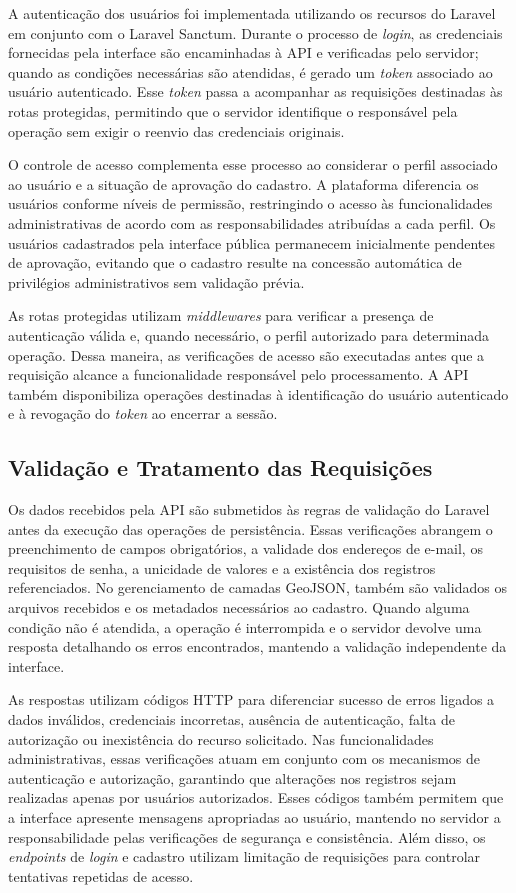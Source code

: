 A autenticação dos usuários foi implementada utilizando os recursos do Laravel em conjunto com o Laravel Sanctum. Durante o processo de \textit{login}, as credenciais fornecidas pela interface são encaminhadas à API e verificadas pelo servidor; quando as condições necessárias são atendidas, é gerado um \textit{token} associado ao usuário autenticado. Esse \textit{token} passa a acompanhar as requisições destinadas às rotas protegidas, permitindo que o servidor identifique o responsável pela operação sem exigir o reenvio das credenciais originais.

O controle de acesso complementa esse processo ao considerar o perfil associado ao usuário e a situação de aprovação do cadastro. A plataforma diferencia os usuários conforme níveis de permissão, restringindo o acesso às funcionalidades administrativas de acordo com as responsabilidades atribuídas a cada perfil. Os usuários cadastrados pela interface pública permanecem inicialmente pendentes de aprovação, evitando que o cadastro resulte na concessão automática de privilégios administrativos sem validação prévia.

As rotas protegidas utilizam \textit{middlewares} para verificar a presença de autenticação válida e, quando necessário, o perfil autorizado para determinada operação. Dessa maneira, as verificações de acesso são executadas antes que a requisição alcance a funcionalidade responsável pelo processamento. A API também disponibiliza operações destinadas à identificação do usuário autenticado e à revogação do \textit{token} ao encerrar a sessão.

\subsection{Validação e Tratamento das Requisições}
\label{sec:validacao-requisicoes}

Os dados recebidos pela API são submetidos às regras de validação do Laravel antes da execução das operações de persistência. Essas verificações abrangem o preenchimento de campos obrigatórios, a validade dos endereços de e-mail, os requisitos de senha, a unicidade de valores e a existência dos registros referenciados. No gerenciamento de camadas GeoJSON, também são validados os arquivos recebidos e os metadados necessários ao cadastro. Quando alguma condição não é atendida, a operação é interrompida e o servidor devolve uma resposta detalhando os erros encontrados, mantendo a validação independente da interface.

As respostas utilizam códigos HTTP para diferenciar sucesso de erros ligados a dados inválidos, credenciais incorretas, ausência de autenticação, falta de autorização ou inexistência do recurso solicitado. Nas funcionalidades administrativas, essas verificações atuam em conjunto com os mecanismos de autenticação e autorização, garantindo que alterações nos registros sejam realizadas apenas por usuários autorizados. Esses códigos também permitem que a interface apresente mensagens apropriadas ao usuário, mantendo no servidor a responsabilidade pelas verificações de segurança e consistência. Além disso, os \textit{endpoints} de \textit{login} e cadastro utilizam limitação de requisições para controlar tentativas repetidas de acesso.

